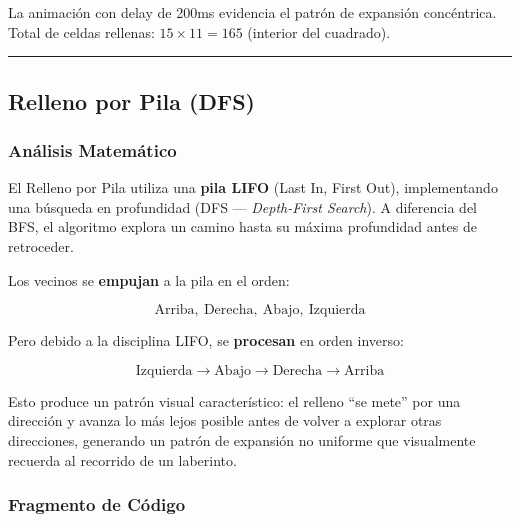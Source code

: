 \documentclass[
  spanish,
  a4paper,
  12pt,
]{article}
\begin{document}
La animación con delay de 200ms evidencia el patrón de expansión
concéntrica. Total de celdas rellenas: \(15 \times 11 = 165\) (interior
del cuadrado).

\begin{center}\rule{0.5\linewidth}{0.5pt}\end{center}

\subsection{Relleno por Pila (DFS)}\label{relleno-por-pila-dfs}

\subsubsection{Análisis
Matemático}\label{anuxe1lisis-matemuxe1tico-7}

El Relleno por Pila utiliza una \textbf{pila LIFO} (Last In, First Out),
implementando una búsqueda en profundidad (DFS --- \emph{Depth-First
Search}). A diferencia del BFS, el algoritmo explora un camino hasta su
máxima profundidad antes de retroceder.

Los vecinos se \textbf{empujan} a la pila en el orden:

\[\text{Arriba},\ \text{Derecha},\ \text{Abajo},\ \text{Izquierda}\]

Pero debido a la disciplina LIFO, se \textbf{procesan} en orden inverso:

\[\text{Izquierda} \to \text{Abajo} \to \text{Derecha} \to \text{Arriba}\]

Esto produce un patrón visual característico: el relleno ``se mete'' por
una dirección y avanza lo más lejos posible antes de volver a explorar
otras direcciones, generando un patrón de expansión no uniforme que
visualmente recuerda al recorrido de un laberinto.

\newpage

\subsubsection{Fragmento de Código}\label{fragmento-de-cuxf3digo-7}
\end{document}

